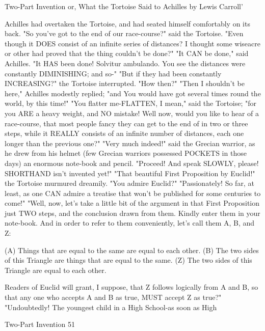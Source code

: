 
                         Two-Part Invention
                                       or,
                        What the Tortoise Said to Achilles
                                by Lewis Carroll'

Achilles had overtaken the Tortoise, and had seated himself comfortably on its back.
   "So you've got to the end of our race-course?" said the Tortoise. "Even though it
DOES consist of an infinite series of distances? I thought some wiseacre or other had
proved that the thing couldn't be done?"
   "It CAN be done," said Achilles. "It HAS been done! Solvitur ambulando. You see the
distances were constantly DIMINISHING; and so-"
   "But if they had been constantly INCREASING?" the Tortoise interrupted. "How
then?"
   "Then I shouldn't be here," Achilles modestly replied; "and You would have got
several times round the world, by this time!"
   "You flatter me-FLATTEN, I mean," said the Tortoise; "for you ARE a heavy weight,
and NO mistake! Well now, would you like to hear of a race-course, that most people
fancy they can get to the end of in two or three steps, while it REALLY consists of an
infinite number of distances, each one longer than the previous one?"
   "Very much indeed!" said the Grecian warrior, as he drew from his helmet (few
Grecian warriors possessed POCKETS in those days) an enormous note-book and pencil.
"Proceed! And speak SLOWLY, please! SHORTHAND isn't invented yet!"
   "That beautiful First Proposition by Euclid!" the Tortoise murmured dreamily. "You
admire Euclid?"
   "Passionately! So far, at least, as one CAN admire a treatise that won't be published
for some centuries to come!"
   "Well, now, let's take a little bit of the argument in that First Proposition just TWO
steps, and the conclusion drawn from them. Kindly enter them in your note-book. And in
order to refer to them conveniently, let's call them A, B, and Z:

     (A) Things that are equal to the same are equal to each other.
     (B) The two sides of this Triangle are things that are equal to the same.
     (Z) The two sides of this Triangle are equal to each other.

  Readers of Euclid will grant, I suppose, that Z follows logically from A and B, so that
any one who accepts A and B as true, MUST accept Z as true?"
  "Undoubtedly! The youngest child in a High School-as soon as High




Two-Part Invention                                                                    51


